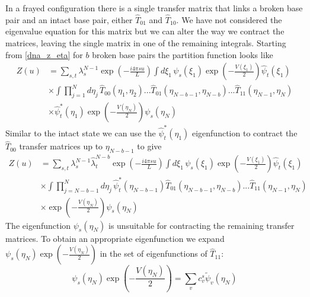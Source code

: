 In a frayed configuration there is a single transfer matrix that links a broken base pair and an intact base pair, either $\hat{T}_{01}$ and $\hat{T}_{10}$. We have not considered the eigenvalue equation for this matrix but we can alter the way we contract the matrices, leaving the single matrix in one of the remaining integrals. Starting from \eqref{dna_z_eta} for $b$ broken base pairs the partition function looks like
%
\begin{align}
\label{dna_frayed_1}
Z\left(u\right)&=\sum_{s,t}\lambda_{s}^{N-1}\exp\left(-\frac{i4\pi s u}{L}\right)\int d\xi_{1}\,\psi_{s}\left(\xi_{1}\right)\exp\left(-\frac{V\left(\xi_{1}\right)}{2}\right)\hat{\psi}_{t}\left(\xi_{1}\right)\nonumber\\
&\times\int\prod_{j=1}^{N}d\eta_{j}\,\hat{T}_{00}\left(\eta_{1},\eta_{2}\right)...\hat{T}_{01}\left(\eta_{N-b-1},\eta_{N-b}\right)...\hat{T}_{11}\left(\eta_{N-1},\eta_{N}\right)\nonumber\\
&\times\hat{\psi}^{*}_{t}\left(\eta_{1}\right)\exp\left(-\frac{V\left(\eta_{N}\right)}{2}\right)\psi_{s}\left(\eta_{N}\right)
\end{align}
%
Similar to the intact state we can use the $\hat{\psi}^{*}_{t}\left(\eta_{1}\right)$ eigenfunction to contract the $\hat{T}_{00}$ transfer matrices up to $\eta_{N-b-1}$ to give 
%
\begin{align}
\label{dna_frayed_2}
Z\left(u\right)&=\sum_{s,t}\lambda_{s}^{N-1}\hat{\lambda}_{t}^{N-b}\exp\left(-\frac{i4\pi s u}{L}\right)\int d\xi_{1}\,\psi_{s}\left(\xi_{1}\right)\exp\left(-\frac{V\left(\xi_{1}\right)}{2}\right)\hat{\psi}_{t}\left(\xi_{1}\right)\nonumber\\
&\times\int\prod_{j=N-b-1}^{N}d\eta_{j}\,\hat{\psi}^{*}_{t}\left(\eta_{N-b-1}\right)\hat{T}_{01}\left(\eta_{N-b-1},\eta_{N-b}\right)...\hat{T}_{11}\left(\eta_{N-1},\eta_{N}\right)\nonumber\\
&\times\exp\left(-\frac{V\left(\eta_{N}\right)}{2}\right)\psi_{s}\left(\eta_{N}\right)
\end{align}
%
The eigenfunction $\psi_{s}\left(\eta_{N}\right)$ is unsuitable for contracting the remaining transfer matrices. To obtain an appropriate eigenfunction we expand $\psi_{s}\left(\eta_{N}\right)\exp\left(-\frac{V\left(\eta_{N}\right)}{2}\right)$ in the set of eigenfunctions of $\hat{T}_{11}$:
%
\begin{equation}
\psi_{s}\left(\eta_{N}\right)\exp\left(-\frac{V\left(\eta_{N}\right)}{2}\right) = \sum_{v}c^{s}_{v}\tilde{\psi}_{v}\left(\eta_{N}\right)
\end{equation}
